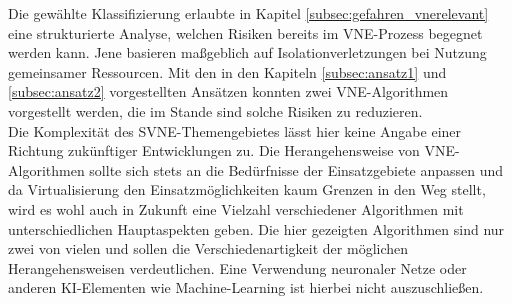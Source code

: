 \documentclass{lni}
\begin{document}
Die gewählte Klassifizierung erlaubte in Kapitel \ref{subsec:gefahren_vnerelevant} eine strukturierte Analyse, welchen Risiken bereits im VNE-Prozess begegnet werden kann.
Jene basieren maßgeblich auf Isolationverletzungen bei Nutzung gemeinsamer Ressourcen. Mit den in den Kapiteln \ref{subsec:ansatz1} und \ref{subsec:ansatz2} vorgestellten Ansätzen konnten zwei VNE-Algorithmen vorgestellt werden, die im Stande sind solche Risiken zu reduzieren.\\
Die Komplexität des SVNE-Themengebietes lässt hier keine Angabe einer Richtung zukünftiger Entwicklungen zu. Die Herangehensweise von VNE-Algorithmen sollte sich stets an die Bedürfnisse der Einsatzgebiete anpassen und da Virtualisierung den Einsatzmöglichkeiten kaum Grenzen in den Weg stellt, wird es wohl auch in Zukunft eine Vielzahl verschiedener Algorithmen mit unterschiedlichen Hauptaspekten geben. Die hier gezeigten Algorithmen sind nur zwei von vielen und sollen die Verschiedenartigkeit der möglichen Herangehensweisen verdeutlichen. Eine Verwendung neuronaler Netze oder anderen KI-Elementen wie Machine-Learning ist hierbei nicht auszuschließen.










\nocite{fischer2011position}

~\newpage
{}
\end{document}
